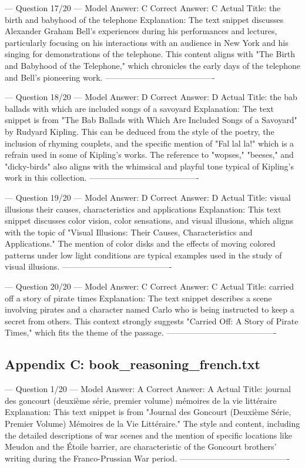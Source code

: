 \documentclass[11pt]{article}
\begin{document}
{--- Question 17/20 ---
Model Answer:    C
Correct Answer:  C
Actual Title:    the birth and babyhood of the telephone
Explanation:     The text snippet discusses Alexander Graham Bell's experiences during his performances and lectures, particularly focusing on his interactions with an audience in New York and his singing for demonstrations of the telephone. This content aligns with "The Birth and Babyhood of the Telephone," which chronicles the early days of the telephone and Bell's pioneering work.
----------------------------------------

--- Question 18/20 ---
Model Answer:    D
Correct Answer:  D
Actual Title:    the bab ballads with which are included songs of a savoyard
Explanation:     The text snippet is from "The Bab Ballads with Which Are Included Songs of a Savoyard" by Rudyard Kipling. This can be deduced from the style of the poetry, the inclusion of rhyming couplets, and the specific mention of "Fal lal la!" which is a refrain used in some of Kipling's works. The reference to "wopses," "beeses," and "dicky-birds" also aligns with the whimsical and playful tone typical of Kipling's work in this collection.
----------------------------------------

--- Question 19/20 ---
Model Answer:    D
Correct Answer:  D
Actual Title:    visual illusions their causes, characteristics and applications
Explanation:     This text snippet discusses color vision, color sensations, and visual illusions, which aligns with the topic of "Visual Illusions: Their Causes, Characteristics and Applications." The mention of color disks and the effects of moving colored patterns under low light conditions are typical examples used in the study of visual illusions.
----------------------------------------

--- Question 20/20 ---
Model Answer:    C
Correct Answer:  C
Actual Title:    carried off a story of pirate times
Explanation:     The text snippet describes a scene involving pirates and a character named Carlo who is being instructed to keep a secret from others. This context strongly suggests "Carried Off: A Story of Pirate Times," which fits the theme of the passage.
----------------------------------------

\newpage
\subsection{Appendix C: book\_reasoning\_french.txt}
--- Question 1/20 ---
Model Answer:    A
Correct Answer:  A
Actual Title:    journal des goncourt (deuxième série, premier volume) mémoires de la vie littéraire
Explanation:     This text snippet is from "Journal des Goncourt (Deuxième Série, Premier Volume) Mémoires de la Vie Littéraire." The style and content, including the detailed descriptions of war scenes and the mention of specific locations like Meudon and the Étoile barrier, are characteristic of the Goncourt brothers' writing during the Franco-Prussian War period.
----------------------------------------

}
\end{document}
